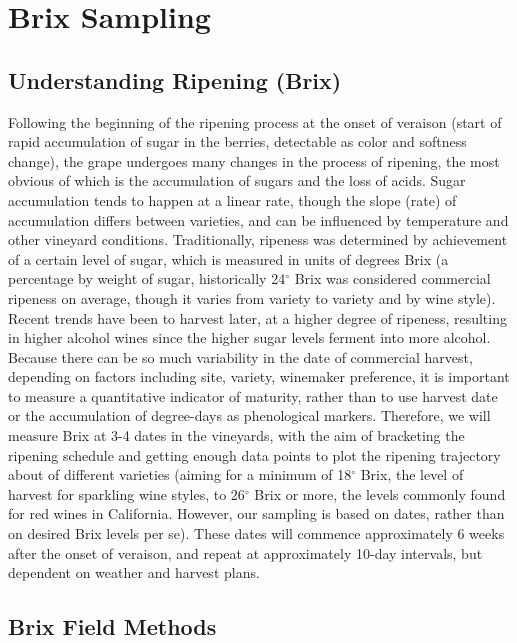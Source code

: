 \documentclass[11pt,letter]{article}
\begin{document}
\section{Brix Sampling}
\subsection{Understanding Ripening (Brix)}

Following the beginning of the ripening process at the onset of veraison (start of rapid accumulation of sugar in the berries, detectable as color and softness change), the grape undergoes many changes in the process of ripening, the most obvious of which is the accumulation of sugars and the loss of acids. Sugar accumulation tends to happen at a linear rate, though the slope (rate) of accumulation differs between varieties, and can be influenced by temperature and other vineyard conditions. Traditionally, ripeness was determined by achievement of a certain level of sugar, which is measured in units of degrees Brix (a percentage by weight of sugar, historically 24$^{\circ}$ Brix was considered commercial ripeness on average, though it varies from variety to variety and by wine style). Recent trends have been to harvest later, at a higher degree of ripeness, resulting in higher alcohol wines since the higher sugar levels ferment into more alcohol. \\

Because there can be so much variability in the date of commercial harvest, depending on factors including site, variety, winemaker preference, it is important to measure a quantitative indicator of maturity, rather than to use harvest date or the accumulation of degree-days as phenological markers. Therefore, we will measure Brix at 3-4 dates in the vineyards, with the aim of bracketing the ripening schedule and getting enough data points to plot the ripening trajectory about of different varieties (aiming for a minimum of 18$^{\circ}$ Brix, the level of harvest for sparkling wine styles, to  26$^{\circ}$ Brix or more, the levels commonly found for red wines in California. However, our sampling is based on dates, rather than on desired Brix levels per se). These dates will commence approximately 6 weeks after the onset of veraison, and repeat at approximately 10-day intervals, but dependent on weather and harvest plans. 

\subsection{Brix Field Methods}
\end{document}
